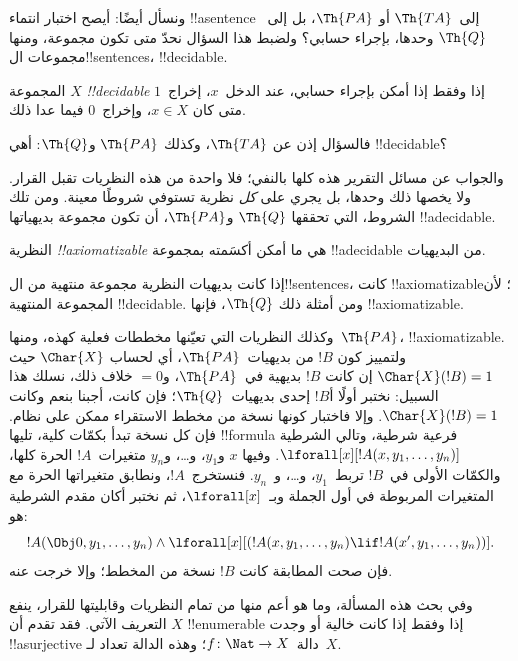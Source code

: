 \documentclass[../../../include/open-logic-section]{subfiles}
\begin{document}
ونسأل أيضًا: أيصح اختبار انتماء !!a{sentence}
إلى~$\Th{TA}$ أو $\Th{PA}$، بل إلى~$\Th{Q}$ وحدها،
بإجراء حسابي؟ ولضبط هذا السؤال نحدّ متى تكون مجموعة،
ومنها مجموعات ال!!{sentence}s، !!{decidable}.

\begin{defn}
المجموعة $X$ \emph{!!{decidable}} إذا وفقط إذا أمكن
بإجراء حسابي، عند الدخل~$x$، إخراج~$1$ متى كان
$x\in X$، وإخراج~$0$ فيما عدا ذلك.
\end{defn}

فالسؤال إذن عن $\Th{TA}$، وكذلك $\Th{PA}$ و$\Th{Q}$:
أهي !!{decidable}؟

والجواب عن مسائل التقرير هذه كلها بالنفي؛ فلا واحدة
من هذه النظريات تقبل القرار. ولا يخصها ذلك وحدها،
بل يجري على \emph{كل} نظرية تستوفي شروطًا معينة.
ومن تلك الشروط، التي تحققها $\Th{Q}$ و$\Th{PA}$،
أن تكون مجموعة بديهياتها !!a{decidable}.

\begin{defn}
النظرية \emph{!!{axiomatizable}} هي ما أمكن أكسَمته بمجموعة
!!a{decidable} من البديهيات.
\end{defn}

\begin{ex}
إذا كانت بديهيات النظرية مجموعة منتهية من
ال!!{sentence}s، كانت !!{axiomatizable}؛ لأن المجموعة
المنتهية !!{decidable}. ومن أمثلة ذلك $\Th{Q}$،
فإنها !!{axiomatizable}.

وكذلك النظريات التي تعيّنها مخططات فعلية كهذه،
ومنها~$\Th{PA}$، !!{axiomatizable}. ولتمييز كون $!B$
من بديهيات~$\Th{PA}$، أي لحساب $\Char{X}$ حيث
$\Char{X}(!B)=1$ إن كانت $!B$ بديهية في~$\Th{PA}$،
و$=0$ خلاف ذلك، نسلك هذا السبيل: نختبر أولًا أ$!B$
إحدى بديهيات~$\Th{Q}$؛ فإن كانت، أجبنا بنعم وكانت
$\Char{X}(!B)=1$. وإلا فاختبار كونها نسخة من مخطط
الاستقراء ممكن على نظام. فإن كل نسخة تبدأ بكمّات كلية،
تليها !!{formula} فرعية شرطية، وتالي الشرطية
$\lforall[x][!A(x,y_1,\dots,y_n)]$. وفيها $x$ و$y_1$،
و\dots، و$y_n$ متغيرات~$!A$ الحرة كلها، والكمّات
الأولى في~$!B$ تربط~$y_1$، و\dots، و~$y_n$.
فنستخرج~$!A$، ونطابق متغيراتها الحرة مع المتغيرات
المربوطة في أول الجملة وبـ~$\lforall[x]$،
ثم نختبر أكان مقدم الشرطية هو:
\[
!A(\Obj 0, y_1, \dots, y_n) \land \lforall[x][(!A(x, y_1, \dots, y_n)
\lif !A(x', y_1, \dots, y_n))].
\]
فإن صحت المطابقة كانت $!B$ نسخة من المخطط؛ وإلا خرجت عنه.
\end{ex}

وفي بحث هذه المسألة، وما هو أعم منها من تمام النظريات
وقابليتها للقرار، ينفع التعريف الآتي. فقد تقدم أن $X$
!!{enumerable} إذا وفقط إذا كانت خالية أو وجدت
!!a{surjective} دالة~$f\colon\Nat\to X$؛ وهذه الدالة
تعداد لـ~$X$.
\end{document}
